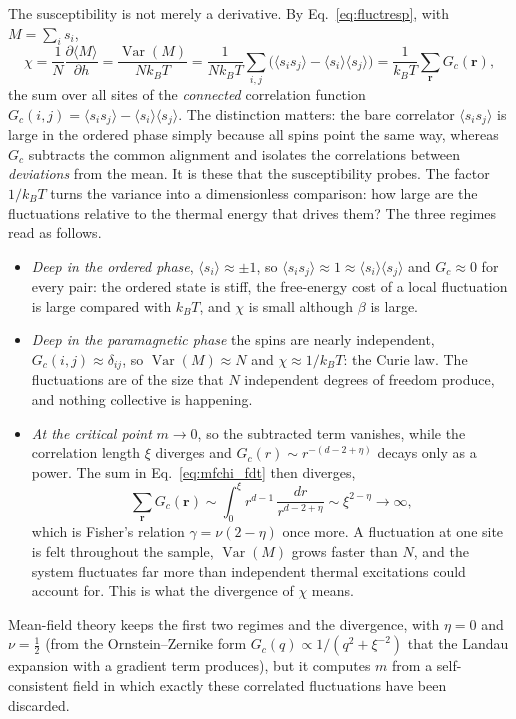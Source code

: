 \documentclass[10pt,a4paper]{article}
\theoremstyle{remark}
\newcommand{\Var}{\operatorname{Var}}
\begin{document}
The susceptibility is not merely a derivative. By Eq.~\eqref{eq:fluctresp},
with $M=\sum_is_i$,
\begin{equation}\label{eq:mfchi_fdt}
  \chi=\frac{1}{N}\frac{\partial\langle M\rangle}{\partial h}
  =\frac{\Var(M)}{Nk_BT}
  =\frac{1}{Nk_BT}\sum_{i,j}\big(\langle s_is_j\rangle-\langle s_i\rangle\langle s_j\rangle\big)
  =\frac{1}{k_BT}\sum_{\mathbf r}G_c(\mathbf r) ,
\end{equation}
the sum over all sites of the \emph{connected} correlation function
$G_c(i,j)=\langle s_is_j\rangle-\langle s_i\rangle\langle s_j\rangle$. The
distinction matters: the bare correlator $\langle s_is_j\rangle$ is large in the
ordered phase simply because all spins point the same way, whereas $G_c$
subtracts the common alignment and isolates the correlations between
\emph{deviations} from the mean. It is these that the susceptibility probes.
The factor $1/k_BT$ turns the variance into a dimensionless comparison: how
large are the fluctuations relative to the thermal energy that drives them?
The three regimes read as follows.
\begin{itemize}
\item \emph{Deep in the ordered phase}, $\langle s_i\rangle\approx\pm1$, so
$\langle s_is_j\rangle\approx1\approx\langle s_i\rangle\langle s_j\rangle$ and
$G_c\approx0$ for every pair: the ordered state is stiff, the free-energy cost
of a local fluctuation is large compared with $k_BT$, and $\chi$ is small
although $\beta$ is large.
\item \emph{Deep in the paramagnetic phase} the spins are nearly independent,
$G_c(i,j)\approx\delta_{ij}$, so $\Var(M)\approx N$ and $\chi\approx1/k_BT$: the
Curie law. The fluctuations are of the size that $N$ independent degrees of
freedom produce, and nothing collective is happening.
\item \emph{At the critical point} $m\to0$, so the subtracted term vanishes,
while the correlation length $\xi$ diverges and $G_c(r)\sim r^{-(d-2+\eta)}$
decays only as a power. The sum in Eq.~\eqref{eq:mfchi_fdt} then diverges,
\[
  \sum_{\mathbf r}G_c(\mathbf r)\sim\int_0^{\xi}r^{d-1}\,\frac{dr}{r^{d-2+\eta}}
  \sim\xi^{2-\eta}\to\infty ,
\]
which is Fisher's relation $\gamma=\nu(2-\eta)$ once more. A fluctuation at
one site is felt throughout the sample, $\Var(M)$ grows faster than $N$, and
the system fluctuates far more than independent thermal excitations could
account for. This is what the divergence of $\chi$ means.
\end{itemize}
Mean-field theory keeps the first two regimes and the divergence, with
$\eta=0$ and $\nu=\tfrac12$ (from the Ornstein--Zernike form
$G_c(q)\propto1/(q^{2}+\xi^{-2})$ that the Landau expansion with a gradient
term produces), but it computes $m$ from a self-consistent field in which
exactly these correlated fluctuations have been discarded.
\end{document}
